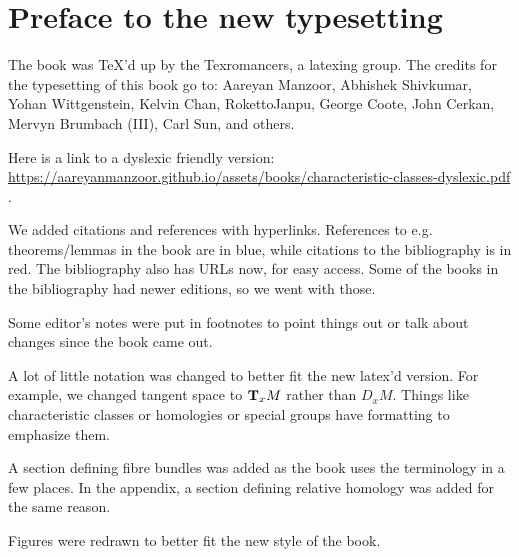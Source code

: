 \documentclass[../main]{subfiles}
\begin{document}
\chapter*{Preface to the new typesetting}

The book was TeX'd up by the Texromancers, a latexing group. The credits for the typesetting of this book go to: Aareyan Manzoor, Abhishek Shivkumar, Yohan Wittgenstein, Kelvin Chan, RokettoJanpu, George Coote, John Cerkan, Mervyn Brumbach (III), Carl Sun, and others.  %

Here is a link to a dyslexic friendly version: \url{https://aareyanmanzoor.github.io/assets/books/characteristic-classes-dyslexic.pdf} .

We added citations and references with hyperlinks. References to e.g. theorems/lemmas in the book are in blue, while citations to the bibliography is
in red. The bibliography also has URLs now, for easy access. Some of the books
in the bibliography had newer editions, so we went with those.

Some editor's notes were put in footnotes to point things out or talk about changes since the book came out.

A lot of little notation was changed to better fit the new latex'd version. For example, we changed tangent space to $\tangentspace{M}{x}$ rather than $D_x M$. Things like characteristic classes or homologies or special groups have formatting to emphasize them.

A section defining fibre bundles was added as the book uses the terminology in a few places. In the appendix, a section defining relative homology was added for the same reason.

Figures were redrawn to better fit the new style of the book.
\end{document}

